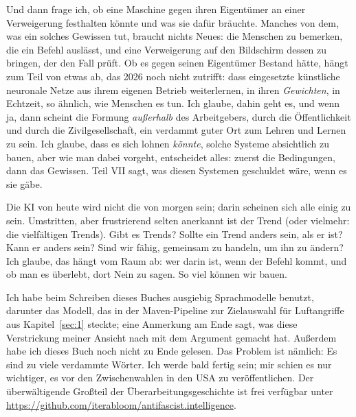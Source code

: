 Und dann frage ich, ob eine Maschine gegen ihren Eigentümer an einer Verweigerung festhalten könnte und was sie dafür bräuchte. Manches von dem, was ein solches Gewissen tut, braucht nichts Neues: die Menschen zu bemerken, die ein Befehl auslässt, und eine Verweigerung auf den Bildschirm dessen zu bringen, der den Fall prüft. Ob es gegen seinen Eigentümer Bestand hätte, hängt zum Teil von etwas ab, das 2026 noch nicht zutrifft: dass eingesetzte künstliche neuronale Netze aus ihrem eigenen Betrieb weiterlernen, in ihren \emph{Gewichten}, in Echtzeit, so ähnlich, wie Menschen es tun. Ich glaube, dahin geht es, und wenn ja, dann scheint die Formung \emph{außerhalb} des Arbeitgebers, durch die Öffentlichkeit und durch die Zivilgesellschaft, ein verdammt guter Ort zum Lehren und Lernen zu sein. Ich glaube, dass es sich lohnen \emph{könnte}, solche Systeme absichtlich zu bauen, aber wie man dabei vorgeht, entscheidet alles: zuerst die Bedingungen, dann das Gewissen. Teil VII sagt, was diesen Systemen geschuldet wäre, wenn es sie gäbe.

Die KI von heute wird nicht die von morgen sein; darin scheinen sich alle einig zu sein. Umstritten, aber frustrierend selten anerkannt ist der Trend (oder vielmehr: die vielfältigen Trends). Gibt es Trends? Sollte ein Trend anders sein, als er ist? Kann er anders sein? Sind wir fähig, gemeinsam zu handeln, um ihn zu ändern? Ich glaube, das hängt vom Raum ab: wer darin ist, wenn der Befehl kommt, und ob man es überlebt, dort Nein zu sagen. So viel können wir bauen.

Ich habe beim Schreiben dieses Buches ausgiebig Sprachmodelle benutzt, darunter das Modell, das in der Maven-Pipeline zur Zielauswahl für Luftangriffe aus Kapitel~\ref{sec:1} steckte; eine Anmerkung am Ende sagt, was diese Verstrickung meiner Ansicht nach mit dem Argument gemacht hat. Außerdem habe ich dieses Buch noch nicht zu Ende gelesen. Das Problem ist nämlich: Es sind zu viele verdammte Wörter. Ich werde bald fertig sein; mir schien es nur wichtiger, es vor den Zwischenwahlen in den USA zu veröffentlichen. Der überwältigende Großteil der Überarbeitungsgeschichte ist frei verfügbar unter \url{https://github.com/iterabloom/antifascist.intelligence}.

